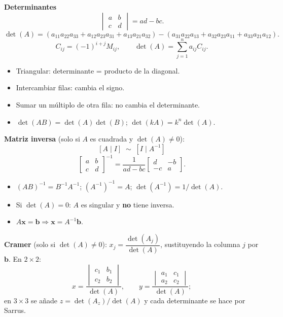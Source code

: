 \documentclass[12pt, letterpaper]{article}
\newcommand{\mwmat}[1]{\ensuremath{\begin{bmatrix}#1\end{bmatrix}}}
\newcommand{\mwdet}[1]{\ensuremath{\begin{vmatrix}#1\end{vmatrix}}}
\begin{document}
\begin{cuadroteoria}
  \small
  \textbf{Determinantes}
  \[
    \mwdet{a&b\\c&d}=ad-bc.
  \]
  \[
    \det(A)=(a_{11}a_{22}a_{33}+a_{12}a_{23}a_{31}+a_{13}a_{21}a_{32})
    -(a_{31}a_{22}a_{13}+a_{32}a_{23}a_{11}+a_{33}a_{21}a_{12}).
  \]
  \[
    C_{ij}=(-1)^{i+j}M_{ij},
    \qquad
    \det(A)=\sum_{j=1}^{n}a_{ij}C_{ij}.
  \]
  \begin{itemize}[leftmargin=1.2em, nosep]
    \item Triangular: determinante = producto de la diagonal.
    \item Intercambiar filas: cambia el signo.
    \item Sumar un múltiplo de otra fila: no cambia el determinante.
    \item $\det(AB)=\det(A)\det(B)$; $\det(kA)=k^n\det(A)$.
  \end{itemize}

  \medskip
  \textbf{Matriz inversa} (solo si $A$ es cuadrada y $\det(A)\neq0$):
  \[
    [A\mid I]\;\sim\;[I\mid A^{-1}]
  \]
  \[
    \mwmat{a&b\\c&d}^{-1}
    =\frac{1}{ad-bc}\mwmat{d&-b\\-c&a}.
  \]
  \begin{itemize}[leftmargin=1.2em, nosep]
    \item $(AB)^{-1}=B^{-1}A^{-1}$; \quad $(A^{-1})^{-1}=A$;
          \quad $\det(A^{-1})=1/\det(A)$.
    \item Si $\det(A)=0$: $A$ es singular y \textbf{no} tiene inversa.
    \item $A\mathbf{x}=\mathbf{b}\Rightarrow\mathbf{x}=A^{-1}\mathbf{b}$.
  \end{itemize}

  \medskip
  \textbf{Cramer} (solo si $\det(A)\neq0$): $x_j=\dfrac{\det(A_j)}{\det(A)}$,
  sustituyendo la columna $j$ por $\mathbf{b}$. En $2\times2$:
  \[
    x=\frac{\mwdet{c_1&b_1\\c_2&b_2}}{\det(A)},
    \qquad
    y=\frac{\mwdet{a_1&c_1\\a_2&c_2}}{\det(A)};
  \]
  en $3\times3$ se añade $z=\det(A_z)/\det(A)$ y cada determinante se hace
  por Sarrus.
\end{cuadroteoria}
\end{document}
